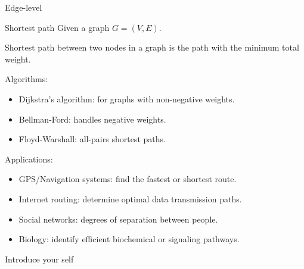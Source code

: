     \begin{frame}{Edge-level}
        \begin{exampleblock}{Shortest path}
            Given a graph $G = (V, E)$.
            
            Shortest path between two nodes in a graph is the path with the minimum total weight.
        \end{exampleblock}
        
        Algorithms:
        \begin{itemize}
            \item Dijkstra's algorithm: for graphs with non-negative weights.
            \item Bellman-Ford: handles negative weights.
            \item Floyd-Warshall: all-pairs shortest paths.
        \end{itemize}

        Applications:
        \begin{itemize}
            \item GPS/Navigation systems: find the fastest or shortest route.
            \item Internet routing: determine optimal data transmission paths.
            \item Social networks: degrees of separation between people.
            \item Biology: identify efficient biochemical or signaling pathways.
        \end{itemize}

        \begin{note}
            {Introduce your self}
        \end{note}
    \end{frame}

